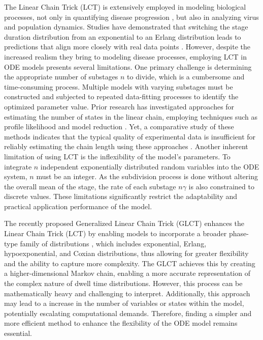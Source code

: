 \documentclass[12pt]{article}
\begin{document}
The Linear Chain Trick (LCT) is extensively employed in modeling biological processes, not only in quantifying disease progression \cite{lloyd2001destabilization}\cite{lloyd2001realistic}, but also in analyzing virus \cite{lloyd2001dependence}\cite{kakizoe2015method} and population \cite{cushing2013integrodifferential} dynamics. Studies have demonstrated that switching the stage duration distribution from an exponential to an Erlang distribution leads to predictions that align more closely with real data points \cite{kakizoe2015method}. However, despite the increased realism they bring to modeling disease processes, employing LCT in ODE models presents several limitations. One primary challenge is determining the appropriate number of substages $n$ to divide, which is a cumbersome and time-consuming process. Multiple models with varying substages must be constructed and subjected to repeated data-fitting processes to identify the optimized parameter value. Prior research has investigated approaches for estimating the number of states in the linear chain, employing techniques such as profile likelihood \cite{raue2009structural} and model reduction \cite{maiwald2016driving}. Yet, a comparative study of these methods indicates that the typical quality of experimental data is insufficient for reliably estimating the chain length using these approaches \cite{hauber2020estimating}. Another inherent limitation of using LCT is the inflexibility of the model's parameters. To integrate $n$ independent exponentially distributed random variables into the ODE system, $n$ must be an integer. As the subdivision process is done without altering the overall mean of the stage, the rate of each substage $n\gamma$ is also constrained to discrete values. These limitations significantly restrict the adaptability and practical application performance of the model.

The recently proposed Generalized Linear Chain Trick (GLCT) enhances the Linear Chain Trick (LCT) by enabling models to incorporate a broader phase-type family of distributions \cite{hurtado2019generalizations}\cite{hurtado2021building}\cite{bladt2017phase}, which includes exponential, Erlang, hypoexponential, and Coxian distributions, thus allowing for greater flexibility and the ability to capture more complexity. The GLCT achieves this by creating a higher-dimensional Markov chain, enabling a more accurate representation of the complex nature of dwell time distributions. However, this process can be mathematically heavy and challenging to interpret. Additionally, this approach may lead to a increase in the number of variables or states within the model, potentially escalating computational demands. Therefore, finding a simpler and more efficient method to enhance the flexibility of the ODE model remains essential.
\end{document}
